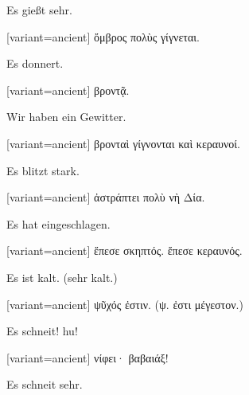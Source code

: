 Es gießt sehr.

\switchcolumn

\begin{greek}[variant=ancient]%
ὄμβρος πολὺς γίγνεται.

\end{greek}%
\switchcolumn*

Es donnert.

\switchcolumn

\begin{greek}[variant=ancient]%
βροντᾷ.

\end{greek}%
\switchcolumn*

Wir haben ein Gewitter.

\switchcolumn

\begin{greek}[variant=ancient]%
βρονταὶ γίγνονται καὶ κεραυνοί.

\end{greek}%
\switchcolumn*

Es blitzt stark.

\switchcolumn

\begin{greek}[variant=ancient]%
ἀστράπτει πολὺ νὴ Δία.

\end{greek}%
\switchcolumn*

Es hat eingeschlagen.

\switchcolumn

\begin{greek}[variant=ancient]%
ἔπεσε σκηπτός. ἔπεσε κεραυνός.

\end{greek}%
\switchcolumn*

Es ist kalt. (sehr kalt.)

\switchcolumn

\begin{greek}[variant=ancient]%
ψῦχός ἐστιν. (ψ. ἐστι μέγεστον.)

\end{greek}%
\switchcolumn*

Es schneit! hu!

\switchcolumn

\begin{greek}[variant=ancient]%
νίφει· βαβαιάξ!

\end{greek}%
\switchcolumn*

Es schneit sehr.

\switchcolumn

